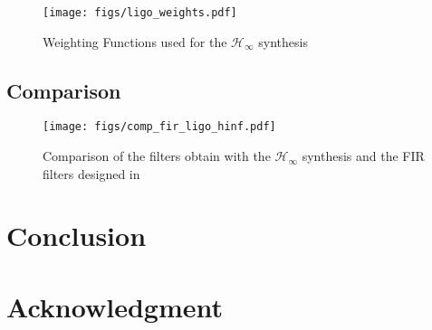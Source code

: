 \documentclass[9pt, technote, a4paper]{ieeeconf}
\begin{document}
\begin{figure}[htbp]
\centering
\texttt{[image: figs/ligo\_weights.pdf]}
\caption{\label{fig:ligo_weights}
Weighting Functions used for the \(\mathcal{H}_\infty\) synthesis}
\end{figure}

\subsection{Comparison}
\label{sec:org7d0ba2b}
\label{sec:ligo_results}

\begin{figure}[htbp]
\centering
\texttt{[image: figs/comp\_fir\_ligo\_hinf.pdf]}
\caption{\label{fig:comp_fir_ligo_hinf}
Comparison of the filters obtain with the \(\mathcal{H}_\infty\) synthesis and the FIR filters designed in \cite{hua05_low_ligo}}
\end{figure}

\section{Conclusion}
\label{sec:org64a0819}
\label{sec:conclusion}

\section{Acknowledgment}
\label{sec:orgc4f1f42}


\end{document}
